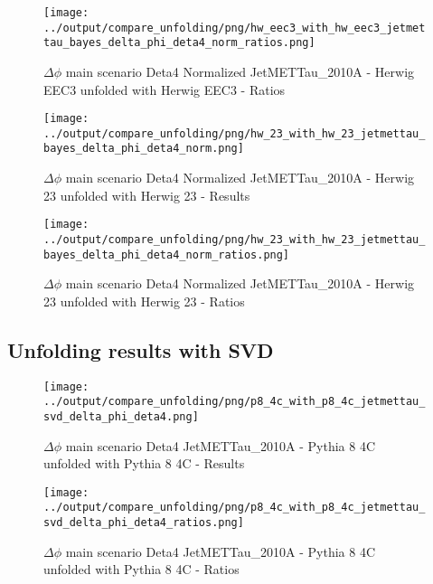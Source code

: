 \documentclass[11pt]{book}
\begin{document}
\begin{figure}[ht]
\centering
\texttt{[image: ../output/compare\_unfolding/png/hw\_eec3\_with\_hw\_eec3\_jetmettau\_bayes\_delta\_phi\_deta4\_norm\_ratios.png]}
\caption{$\Delta\phi$ main scenario Deta4 Normalized JetMETTau\_2010A - Herwig EEC3 unfolded with Herwig EEC3 - Ratios}
\label{hw_eec3_hw_eec3_jetmettau_bayes_delta_phi_deta4_norm_b}
\end{figure}

\begin{figure}[ht]
\centering
\texttt{[image: ../output/compare\_unfolding/png/hw\_23\_with\_hw\_23\_jetmettau\_bayes\_delta\_phi\_deta4\_norm.png]}
\caption{$\Delta\phi$ main scenario Deta4 Normalized JetMETTau\_2010A - Herwig 23 unfolded with Herwig 23 - Results}
\label{hw_23_hw_23_jetmettau_bayes_delta_phi_deta4_norm_a}
\end{figure}

\begin{figure}[ht]
\centering
\texttt{[image: ../output/compare\_unfolding/png/hw\_23\_with\_hw\_23\_jetmettau\_bayes\_delta\_phi\_deta4\_norm\_ratios.png]}
\caption{$\Delta\phi$ main scenario Deta4 Normalized JetMETTau\_2010A - Herwig 23 unfolded with Herwig 23 - Ratios}
\label{hw_23_hw_23_jetmettau_bayes_delta_phi_deta4_norm_b}
\end{figure}



\clearpage
\subsection{Unfolding results with SVD}

\begin{figure}[ht]
\centering
\texttt{[image: ../output/compare\_unfolding/png/p8\_4c\_with\_p8\_4c\_jetmettau\_svd\_delta\_phi\_deta4.png]}
\caption{$\Delta\phi$ main scenario Deta4 JetMETTau\_2010A - Pythia 8 4C unfolded with Pythia 8 4C - Results}
\label{p8_p8_jetmettau_svd_delta_phi_deta4_a}
\end{figure}

\begin{figure}[ht]
\centering
\texttt{[image: ../output/compare\_unfolding/png/p8\_4c\_with\_p8\_4c\_jetmettau\_svd\_delta\_phi\_deta4\_ratios.png]}
\caption{$\Delta\phi$ main scenario Deta4 JetMETTau\_2010A - Pythia 8 4C unfolded with Pythia 8 4C - Ratios}
\label{p8_p8_jetmettau_svd_delta_phi_deta4_b}
\end{figure}
\end{document}
